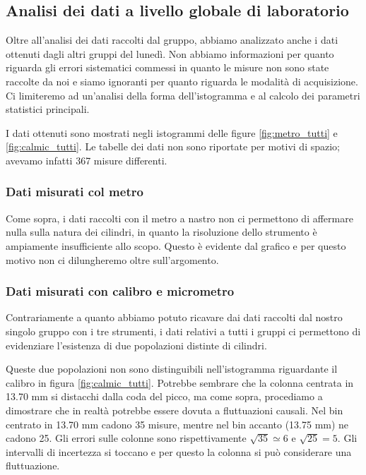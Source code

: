\subsection{Analisi dei dati a livello globale di laboratorio}

Oltre all'analisi dei dati raccolti dal gruppo, abbiamo analizzato anche i dati
ottenuti dagli altri gruppi del lunedì. Non abbiamo informazioni per quanto riguarda
gli errori sistematici commessi in quanto le misure non sono state raccolte
da noi e siamo ignoranti per quanto riguarda le modalità di acquisizione.
Ci limiteremo ad un'analisi della forma dell'istogramma e al calcolo dei parametri
statistici principali.

I dati ottenuti sono mostrati negli istogrammi delle figure \ref{fig:metro_tutti} e \ref{fig:calmic_tutti}.
Le tabelle dei dati non sono riportate per motivi di spazio; avevamo infatti 367 misure differenti.

\subsubsection{Dati misurati col metro}

Come sopra, i dati raccolti con il metro a nastro non ci permettono
di affermare nulla sulla natura dei cilindri, in quanto la risoluzione dello strumento
è ampiamente insufficiente allo scopo. Questo è evidente dal grafico e per
questo motivo non ci dilungheremo oltre sull'argomento.

\subsubsection{Dati misurati con calibro e micrometro}

Contrariamente a quanto abbiamo potuto ricavare dai dati
raccolti dal nostro singolo gruppo con i tre strumenti, i dati relativi
a tutti i gruppi ci permettono di evidenziare l'esistenza di due popolazioni
distinte di cilindri.

Queste due popolazioni non sono distinguibili nell'istogramma riguardante il calibro
in figura \ref{fig:calmic_tutti}. Potrebbe sembrare che la colonna centrata
in 13.70 mm si distacchi dalla coda del picco, ma come sopra, procediamo a dimostrare
che in realtà potrebbe essere dovuta a fluttuazioni causali.
Nel bin centrato in 13.70 mm cadono 35 misure, mentre nel bin accanto (13.75 mm) ne cadono 25.
Gli errori sulle colonne sono rispettivamente $\sqrt{35} \simeq 6$ e $\sqrt{25} = 5$.
Gli intervalli di incertezza si toccano e per questo la colonna si può considerare
una fluttuazione.


